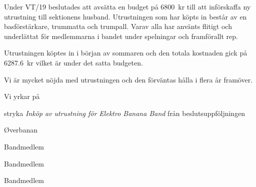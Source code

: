 \documentclass[../_main/handlingar.tex]{subfiles}
\begin{document}
Under VT/19 beslutades att avsätta en budget på \SI{6800}{kr} till att införskaffa ny utrustning till sektionens husband. Utrustningen som har köpts in består av en basförstärkare, trummatta och trumpall. Varav alla har använts flitigt och underlättat för medlemmarna i bandet under spelningar och framförallt rep.

Utrustningen köptes in i början av sommaren och den totala kostnaden gick på \SI{6287.6}{kr} vilket är under det satta budgeten.

Vi är mycket nöjda med utrustningen och den förväntas hålla i flera år framöver.

Vi yrkar på

\begin{attsatser}
    \att stryka \textit{Inköp av utrustning för Elektro Banana Band} från beslutsuppföljningen
\end{attsatser}

\begin{signatures}{4}
    \mvh
    \signature{William Sjödin}{Øverbanan}
    \signature{Daniel Bakic}{Bandmedlem}
    \signature{Oskar Magnusson}{Bandmedlem}
    \signature{Valter Möller}{Bandmedlem}
\end{signatures}
\end{document}
